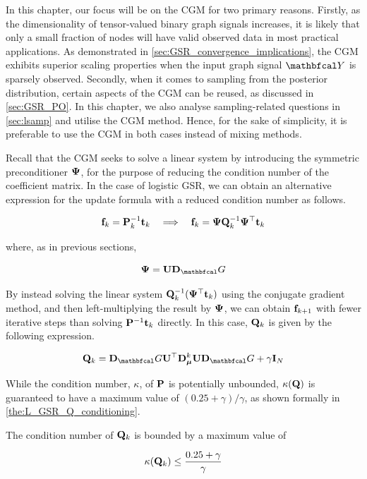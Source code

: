 In this chapter, our focus will be on the CGM for two primary reasons. Firstly, as the dimensionality of tensor-valued binary graph signals increases, it is likely that only a small fraction of nodes will have valid observed data in most practical applications. As demonstrated in \cref{sec:GSR_convergence_implications}, the CGM exhibits superior scaling properties when the input graph signal $\Yt$ is sparsely observed. Secondly, when it comes to sampling from the posterior distribution, certain aspects of the CGM can be reused, as discussed in \cref{sec:GSR_PO}. In this chapter, we also analyse sampling-related questions in \cref{sec:lsamp} and utilise the CGM method. Hence, for the sake of simplicity, it is preferable to use the CGM in both cases instead of mixing methods.

Recall that the CGM seeks to solve a linear system by introducing the symmetric preconditioner $\mathbf{\Psi}$, for the purpose of reducing the condition number of the coefficient matrix. In the case of logistic GSR, we can obtain an alternative expression for the update formula with a reduced condition number as follows. 

\begin{equation*}
    \mathbf{f}_k = \mathbf{P}^{-1}_k \mathbf{t}_k \quad \Longrightarrow \quad \mathbf{f}_k = \mathbf{\Psi} \mathbf{Q}_k^{-1} \mathbf{\Psi}^\top \mathbf{t}_k
\end{equation*}

where, as in previous sections, 

\begin{equation*}
    \PSI = \U \D_\Gt
\end{equation*}

By instead solving the linear system $\mathbf{Q}_k^{-1} (\mathbf{\Psi}^\top \mathbf{t}_k)$ using the conjugate gradient method, and then left-multiplying the result by $\mathbf{\Psi}$, we can obtain $\mathbf{f}_{k+1}$ with fewer iterative steps than solving $\mathbf{P}^{-1} \mathbf{t}_k$ directly. In this case, $\mathbf{Q}_k$ is given by the following expression. 

\begin{equation}
    \label{eq:Q_LGSR}
    \Q_k = \D_\Gt \U^\top \D_{\muu}^k \U \D_\Gt + \gamma \I_N
\end{equation}

While the condition number, $\kappa$, of $\mathbf{P}$ is potentially unbounded, $\kappa(\mathbf{Q})$ is guaranteed to have a maximum value of $(0.25 + \gamma) / \gamma$, as shown formally in \cref{the:L_GSR_Q_conditioning}. 

\begin{theorem}
    \label{the:L_GSR_Q_conditioning}
    
    The condition number of $\mathbf{Q}_k$ is bounded by a maximum value of 
    
    \begin{equation}
        \kappa(\mathbf{Q}_k) \leq \frac{0.25 + \gamma}{\gamma}
    \end{equation}

\end{theorem}

